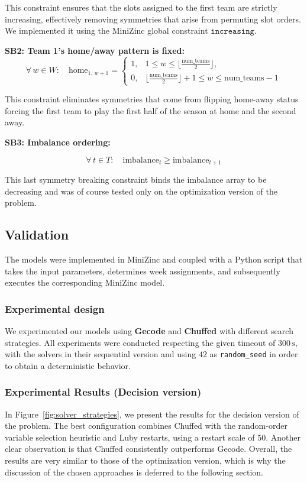 This constraint ensures that the slots assigned to the first team are strictly increasing, effectively removing symmetries that arise from permuting slot orders. We implemented it using the MiniZinc global constraint $\mathtt{increasing}.$

\textbf{SB2: Team 1's home/away pattern is fixed:}
\[
\forall\, w \in W:\quad
\text{home}_{1,\, w+1} =
\begin{cases}
1, & 1 \le w \le \lfloor \tfrac{\text{num\_teams}}{2} \rfloor,\\[2mm]
0, & \lfloor \tfrac{\text{num\_teams}}{2} \rfloor + 1 \le w \le \text{num\_teams}-1
\end{cases}
\]

This constraint eliminates symmetries that come from flipping home-away status forcing the first team to play the first half of the season at home and the second away.

\textbf{SB3: Imbalance ordering:}  

\[
\forall\, t \in T:\quad \text{imbalance}_t \ge \text{imbalance}_{t+1}
\]

This last symmetry breaking constraint binds the imbalance array to be decreasing and was of course tested only on the optimization version of the problem.

\subsection{Validation}
The models were implemented in MiniZinc and coupled with a Python script that takes the input parameters, determines week assignments, and subsequently executes the corresponding MiniZinc model.

\subsubsection{Experimental design}
We experimented our models using \textbf{Gecode} and \textbf{Chuffed} with different search strategies. All experiments were conducted respecting the given timeout of $300\,\mathrm{s}$, with the solvers in their sequential version and using $42$ as \texttt{random\_seed} in order to obtain a deterministic behavior.

\subsubsection{Experimental Results (Decision version)}

In Figure~\ref{fig:solver_strategies}, we present the results for the decision version of the problem. The best configuration combines Chuffed with the random-order variable selection heuristic and Luby restarts, using a restart scale of $50$. Another clear observation is that Chuffed consistently outperforms Gecode. Overall, the results are very similar to those of the optimization version, which is why the discussion of the chosen approaches is deferred to the following section.

